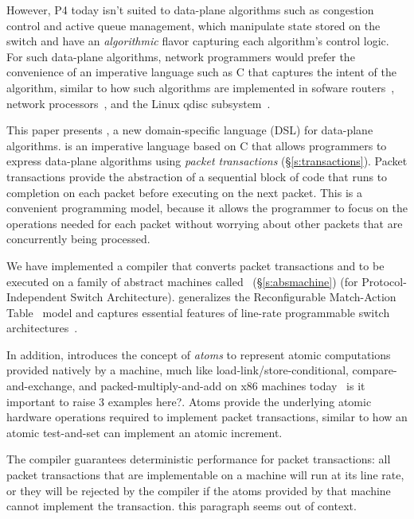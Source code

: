 However, P4 today isn't suited to data-plane algorithms such as congestion
control and active queue management, which manipulate state stored on the
switch and have an \textit{algorithmic} flavor capturing each algorithm's
control logic.  For such data-plane algorithms, network programmers would
prefer the convenience of an imperative language such as C that captures the intent of
the algorithm, similar to how such algorithms are implemented in sofware
routers~\cite{click}, network processors~\cite{packetc, nova}, and the Linux
qdisc subsystem~\cite{qdisc}.

This paper presents \pktlanguage, a new domain-specific language (DSL) 
for data-plane algorithms.
\pktlanguage is an imperative language based on C that allows programmers to
express data-plane algorithms using {\em packet transactions}
(\S\ref{s:transactions}).  Packet transactions provide the abstraction of a
sequential block of code that runs to completion on each packet before
executing on the next packet. This is a convenient programming model, because
it allows the programmer to focus on the operations needed for each packet
without worrying about other packets that are concurrently being processed.

We have implemented a \pktlanguage compiler that converts  
packet transactions and to be executed on a family of abstract machines called
\absmachine~(\S\ref{s:absmachine}) (for Protocol-Independent Switch
Architecture). \absmachine generalizes the Reconfigurable Match-Action
Table~\cite{rmt} model and captures essential features of line-rate programmable
switch architectures~\cite{rmt, xpliant, flexpipe}.

In addition, \absmachine introduces the concept of {\em atoms} to represent
atomic computations provided natively by a \absmachine machine, much like
load-link/store-conditional, compare-and-exchange, and packed-multiply-and-add
on x86 machines today~\cite{x86_manual} \ac{is it important to raise 3 examples here?}. 
Atoms provide the underlying atomic
hardware operations required to implement packet transactions, similar to how
an atomic test-and-set can implement an atomic increment.

The \pktlanguage compiler guarantees deterministic performance for packet
transactions: all packet transactions that are implementable on a \absmachine
machine will run at its line rate, or they will be rejected by the compiler if
the atoms provided by that \absmachine machine cannot implement the
transaction. \ac{this paragraph seems out of context.}

